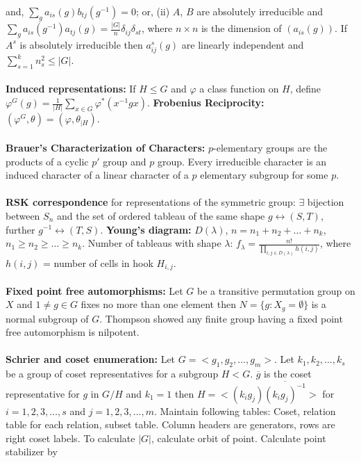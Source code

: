 and,
$\sum_{g} a_{is}(g) b_{tj}(g^{-1}) = 0$; or,
(ii) $A$, $B$ are absolutely irreducible and
$\sum_{g} a_{is}(g^{-1}) a_{tj}(g) =
{\frac {|G|} {n}} \delta_{ij} \delta_{st}$, where $n \times n$ is the
dimension of $(a_{is}(g))$.
If $A^{s}$ is absolutely irreducible then $a^{s}_{ij}(g)$ are linearly
independent and $\sum_{s=1}^k n_{s}^{2} \leq |G|$.\\
\\
{\bf Induced representations:} If $H \le G$ and $\varphi$ a class function on $H$, define
$\varphi^G(g)= {\frac 1 {|H|}} \sum_{x \in G} \varphi^* (x^{-1}gx)$. {\bf Frobenius
Reciprocity:} $(\varphi^G , \theta)= (\varphi, \theta_{|H})$.  \\
\\
{\bf Brauer's Characterization of Characters:} $p$-elementary groups are the products of
a cyclic $p'$ group and $p$ group.  Every irreducible character is an induced character
of a linear character of a $p$ elementary subgroup for some $p$.\\
\\
{\bf RSK correspondence} for representations
of the symmetric group: $\exists$ bijection between $S_n$ and the set of ordered
tableau of the same shape $g \leftrightarrow (S,T)$, further
$g^{-1} \leftrightarrow (T,S)$.
{\bf Young's diagram:} $D(\lambda )$, $n= n_1 + n_2 + \ldots + n_k$,
$n_1 \geq n_2 \geq \ldots \geq n_k$.
Number of tableaus with shape $\lambda$:
$f_{ \lambda } = \frac { n!} {\prod_{i,j \in D(\lambda )} {h(i, j)}}$, where
$h(i, j)$ = number of cells in hook $H_{i,j}$.\\
\\
{\bf Fixed point free automorphisms:} 
Let $G$ be a transitive permutation group on $X$ and $1 \ne g \in G$ fixes
no more than one element then $N= \{g: X_g= \emptyset \}$ is a normal subgroup of $G$.
Thompson showed any finite group having a fixed point free automorphism is nilpotent.\\
\\
{\bf Schrier and coset enumeration:}
Let $G= < g_1 , g_2 , \ldots , g_m >$.  Let $k_1 , k_2 , \ldots ,
k_s$ be a group of coset representatives for a subgroup $H<G$. ${\overline g}$
is the coset representative for $g$ in $G/H$ and $k_1 = 1$ then
$H= < (k_i g_j ) {\overline {(k_i g_j )^{-1}}} >$
for $i= 1, 2, 3, \ldots , s$ and
$j= 1, 2, 3, \ldots , m$.  Maintain following tables: Coset, relation table
for each relation, subset table.  Column headers are generators, rows are
right coset labels.
To calculate $|G|$, calculate orbit of point.  Calculate point stabilizer by
